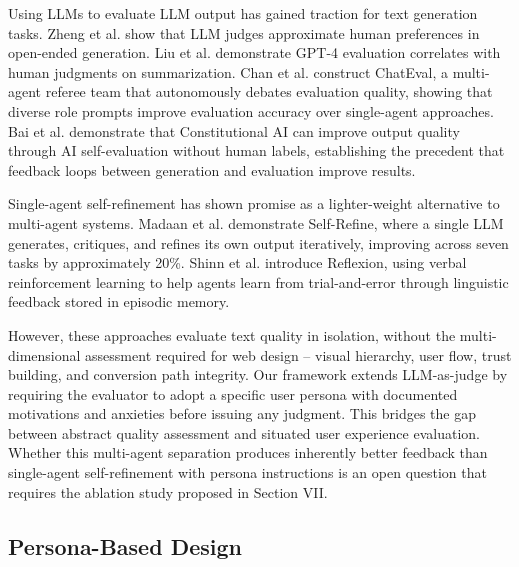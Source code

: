 \documentclass[conference]{IEEEtran}
\begin{document}
Using LLMs to evaluate LLM output has gained traction for text generation tasks. Zheng et al. \cite{zheng2023judging} show that LLM judges approximate human preferences in open-ended generation. Liu et al. \cite{liu2023geval} demonstrate GPT-4 evaluation correlates with human judgments on summarization. Chan et al. \cite{chan2024chateval} construct ChatEval, a multi-agent referee team that autonomously debates evaluation quality, showing that diverse role prompts improve evaluation accuracy over single-agent approaches. Bai et al. \cite{bai2022constitutional} demonstrate that Constitutional AI can improve output quality through AI self-evaluation without human labels, establishing the precedent that feedback loops between generation and evaluation improve results.

Single-agent self-refinement has shown promise as a lighter-weight alternative to multi-agent systems. Madaan et al. \cite{madaan2023selfrefine} demonstrate Self-Refine, where a single LLM generates, critiques, and refines its own output iteratively, improving across seven tasks by approximately 20\%. Shinn et al. \cite{shinn2023reflexion} introduce Reflexion, using verbal reinforcement learning to help agents learn from trial-and-error through linguistic feedback stored in episodic memory.

However, these approaches evaluate text quality in isolation, without the multi-dimensional assessment required for web design -- visual hierarchy, user flow, trust building, and conversion path integrity. Our framework extends LLM-as-judge by requiring the evaluator to adopt a specific user persona with documented motivations and anxieties before issuing any judgment. This bridges the gap between abstract quality assessment and situated user experience evaluation. Whether this multi-agent separation produces inherently better feedback than single-agent self-refinement with persona instructions is an open question that requires the ablation study proposed in Section VII.

\subsection{Persona-Based Design}\label{persona-based-design}
\end{document}
